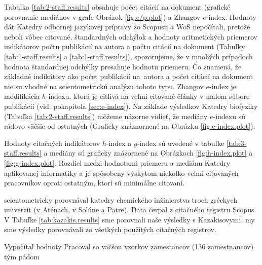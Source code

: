 Tabuľka \ref{tab:2-staff.results} obsahuje počet citácií na dokument (grafické
porovnanie mediánov v grafe Obrázok \ref{fig:c/p.plot}) a Zhangov $e$-index.
Hodnoty dát Katedry odbornej jazykovej prípravy zo Scopusu a WoS nepočítali,
pretože neboli vôbec citované.  štandardných odchýlok a hodnoty aritmetických
priemerov indikátorov počtu publikácií na autora a počtu citácií na dokument
(Tabuľky \ref{tab:1-staff.results} a \ref{tab:1-staff.results}), spozorujeme, že v
mnohých prípadoch hodnota štandardnej odchýlky presahuje hodnotu priemeru.  Čo
znamená, že základné indikátory ako počet publikácií na~autora a počet citácií
na dokument nie su vhodné na scientometrickú analýzu tohoto typu.  Zhangov
$e$-index  je modifikácia $h$-indexu, ktorá je citlivá na veľmi citované články
v malom súbore publikácií (viď. pokapitola \ref{sec:e-index}).  Na základe
výsledkov Katedry biofyziky (Tabuľka \ref{tab:2-staff.results}) môžeme názorne
vidieť, že mediány $e$-indexu sú rádovo väčšie od ostatných (Graficky
znáznornené na Obrázku \ref{fig:e-index.plot}).

Hodnoty citačných indikátorov $h$-index a $g$-index sú uvedené v tabuľke
\ref{tab:3-staff.results} a mediány sú graficky znázornené na Obrázkoch
\ref{fig:h-index.plot} a \ref{fig:g-index.plot}.  Rozdiel medzi hodnotami
priemeru a mediánu Katedry aplikovanej informatiky a je spôsobeny výskytom
niekoľko veľmi citovaných pracovníkov oproti ostatným, ktorí sú minimálne
citovaní.

\citet{Kazakis2015} scientometricky porovnával katedry chemického inžinierstva
troch gréckych univerzít (v Aténach, v Solúne a Patre). Dáta čerpal
z citačného registru Scopus. V Tabuľke \ref{tab:kazakis.results} sme porovnali naše výsledky s Kazakisovymi. my sme výsledky porovnávali zo všetkých použitých
citačných registrov. 


Vypočítal hodnoty Pracoval so väčšou vzorkov zamestancov (136 zamestnancov)
tým pádom 

